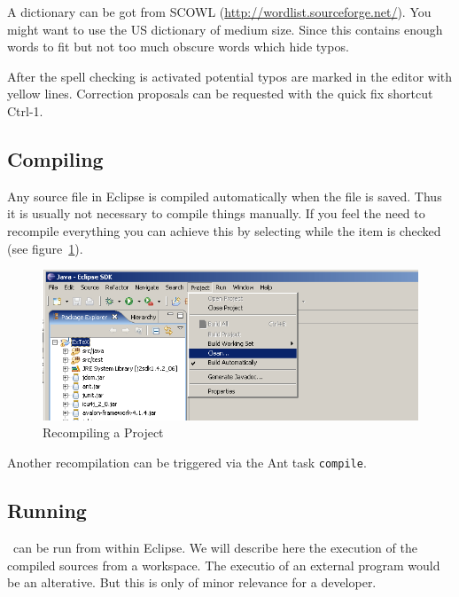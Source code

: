 A dictionary can be got from SCOWL
(\url{http://wordlist.sourceforge.net/}). You might want to use the US
dictionary of medium size. Since this contains enough words to fit but
not too much obscure words which hide typos.

After the spell checking is activated potential typos are marked in
the editor with yellow lines. Correction proposals can be requested
with the quick fix shortcut Ctrl-1.


\subsection{Compiling \ExTeX}

Any source file in Eclipse is compiled automatically when the file is
saved. Thus it is usually not necessary to compile things manually. If
you feel the need to recompile everything you can achieve this by
selecting  while the item  is checked (see
figure~\ref{fig:eclipse-recompile}).
\begin{figure}[thp]
  \centering
  \includegraphics[scale=.4]{image/eclipse-recompile}
  \caption{Recompiling a Project}\label{fig:eclipse-recompile}
\end{figure}

Another recompilation can be triggered via the Ant task \texttt{compile}.

\subsection{Running \ExTeX}

\ExTeX\ can be run from within Eclipse. We will describe here the
execution of the compiled sources from a workspace. The executio of an
external program would be an alterative. But this is only of minor
relevance for a developer.

